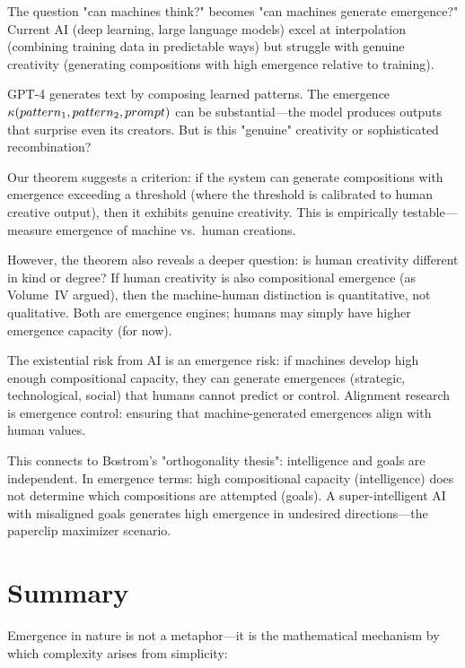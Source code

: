 \begin{interpretation}
The question "can machines think?" becomes "can machines generate emergence?"
Current AI (deep learning, large language models) excel at interpolation
(combining training data in predictable ways) but struggle with genuine creativity
(generating compositions with high emergence relative to training).

GPT-4 generates text by composing learned patterns. The emergence
$\kappa(pattern_1, pattern_2, prompt)$ can be substantial---the model produces
outputs that surprise even its creators. But is this "genuine" creativity or
sophisticated recombination?

Our theorem suggests a criterion: if the system can generate compositions with
emergence exceeding a threshold (where the threshold is calibrated to human
creative output), then it exhibits genuine creativity. This is empirically
testable---measure emergence of machine vs.\ human creations.

However, the theorem also reveals a deeper question: is human creativity
different in kind or degree? If human creativity is also compositional emergence
(as Volume~IV argued), then the machine-human distinction is quantitative, not
qualitative. Both are emergence engines; humans may simply have higher emergence
capacity (for now).

The existential risk from AI is an emergence risk: if machines develop high
enough compositional capacity, they can generate emergences (strategic,
technological, social) that humans cannot predict or control. Alignment research
is emergence control: ensuring that machine-generated emergences align with
human values.

This connects to Bostrom's "orthogonality thesis": intelligence and goals are
independent. In emergence terms: high compositional capacity (intelligence) does
not determine which compositions are attempted (goals). A super-intelligent AI
with misaligned goals generates high emergence in undesired directions---the
paperclip maximizer scenario.
\end{interpretation}



\section{Summary}

Emergence in nature is not a metaphor---it is the mathematical mechanism by which
complexity arises from simplicity:

